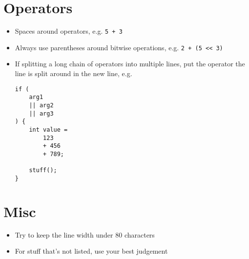 \documentclass{article}
\begin{document}
\section{Operators}

\begin{itemize}
	\item Spaces around operators, e.g. \lstinline{5 + 3}
	\item Always use parentheses around bitwise operations, e.g. \lstinline{2 + (5 << 3)}
	\item If splitting a long chain of operators into multiple lines, put the operator the line is split around in the new line, e.g.
	\begin{lstlisting}
if (
	arg1
	|| arg2
	|| arg3
) {
	int value =
		123
		+ 456
		+ 789;

	stuff();
}
	\end{lstlisting}
\end{itemize}

\section{Misc}

\begin{itemize}
	\item Try to keep the line width under 80 characters
	\item For stuff that's not listed, use your best judgement
\end{itemize}
\end{document}
